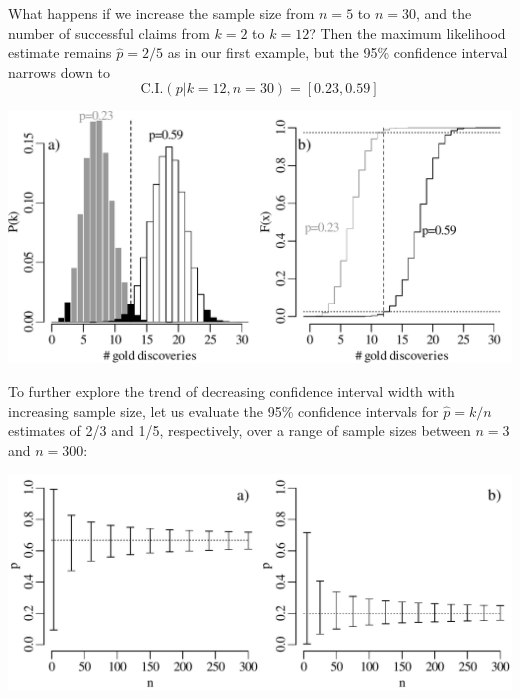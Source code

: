 What happens if we increase the sample size from $n=5$ to $n=30$, and
the number of successful claims from $k=2$ to $k=12$?  Then the
maximum likelihood estimate remains $\hat{p}=2/5$ as in our first
example, but the 95\% confidence interval narrows down to
\[
\mbox{C.I.}(p|k=12,n=30) = [0.23, 0.59]
\]

\noindent\begin{minipage}[t][][b]{.65\textwidth}
\includegraphics[width=\textwidth]{../figures/binomcik12n30.pdf}
\medskip
\end{minipage}
\begin{minipage}[t][][t]{.35\textwidth}
  \label{fig:binomcik12n30}
\end{minipage}

To further explore the trend of decreasing confidence interval width
with increasing sample size, let us evaluate the 95\% confidence
intervals for $\hat{p}=k/n$ estimates of 2/3 and 1/5, respectively,
over a range of sample sizes between $n=3$ and $n=300$:\medskip

\noindent\begin{minipage}[t][][b]{.65\textwidth}
\includegraphics[width=\textwidth]{../figures/binomcivsn.pdf}
\medskip
\end{minipage}
\begin{minipage}[t][][t]{.35\textwidth}
  \label{fig:binomcivsn}
\end{minipage}

